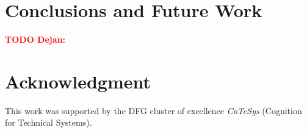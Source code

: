 \documentclass[conference]{IEEEtran}
\newcommand{\todod}[1]{\textbf{\textcolor{red}{TODO Dejan: #1}}}
\begin{document}
\begin{table}[htbp]
\centering
{}
\caption{Experimental Results: Failure rate is the ratio between failures and all test cases. 
Run time is the average run time of all successful test cases, which characterizes the
computational cost. The tolerance is the converge criteria defined as the curve-displacement
between two successive iterations.}
\label{tab:qr}
\end{table}

\section{Conclusions and Future Work}
\label{sec:conclusions}
\todod{}
\section*{Acknowledgment}
 This work was supported by the DFG cluster of excellence \emph{CoTeSys} (Cognition for Technical Systems).


\end{document}
